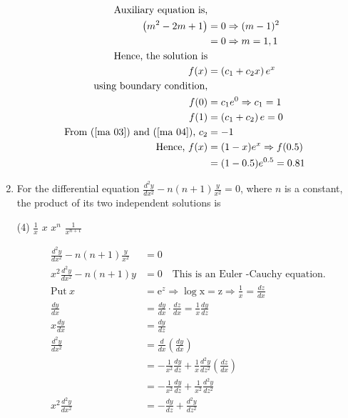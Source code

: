 \begin{enumerate}[label=\color{ocre}\textbf{\arabic*.}]
\begin{answer}
\begin{align}
		\text{Auxiliary equation is,}\notag\\
		\left(m^{2}-2 m+1\right)&=0 \Rightarrow(m-1)^{2}\notag\\&=0 \Rightarrow m=1,1\notag\\
		\text{Hence, the solution is}\notag\\
		f(x)&=\left(c_{1}+c_{2} x\right) e^{x}\notag\\
		\text{using boundary condition,}\notag\\
		f(0)&=c_{1} e^{0} \Rightarrow c_{1}=1 \label{ma 03}\\
		f(1)&=\left(c_{1}+c_{2}\right) e=0 \label{ma 04}\\
		\text{	From (\ref{ma 03}) and (\ref{ma 04}), }c_{2}&=-1 \label{ma 05}\notag\\
		\text{Hence, }f(x)&=(1-x) e^{x} \Rightarrow f(0.5)\notag\\&=(1-0.5) e^{0.5}=0.81\notag
		\end{align}
	\end{answer}
	\item  For the differential equation $\frac{d^{2} y}{d x^{2}}-n(n+1) \frac{y}{x^{2}}=0$, where $n$ is a constant, the product of
	its two independent solutions is
	{}
	\begin{tasks}(4)
		\task[\textbf{A.}] $\frac{1}{x}$
		\task[\textbf{B.}] $x$
		\task[\textbf{C.}] $x^{n}$
		\task[\textbf{D.}] $\frac{1}{x^{n+1}}$
	\end{tasks}
	\begin{answer}
		\begin{align*}
		\frac{d^{2} y}{d x^{2}}-n(n+1) \frac{y}{x^{2}}&=0\\
		x^{2}\frac{d^{2} y}{d x^{2}}-n(n+1) y&=0 \quad \text{This is an Euler -Cauchy equation.}\\
		\text{Put} \ {x}&=\mathrm{e}^{z} \Rightarrow \log \mathrm{x}=\mathrm{z} \Rightarrow \frac{1}{x}=\frac{d z}{d x}\\
		\frac{d y}{d x}&=\frac{d y}{d x} \cdot \frac{d z}{d x}=\frac{1}{x} \frac{d y}{d z} \\ 
		{x} \frac{d y}{d x}&=\frac{d y}{d z}\\
		\frac{d^{2} y}{d x^{2}}&=\frac{d}{d x}\left(\frac{d y}{d x}\right)\\&=-\frac{1}{x^{2}} \frac{d y}{d z}+\frac{1}{x} \frac{d^{2} y}{d z^{2}}\left(\frac{d z}{d x}\right)\\&=-\frac{1}{x^{2}} \frac{d y}{d z}+\frac{1}{x^{2}} \frac{d^{2} y}{d z^{2}} \\ x^{2} \frac{d^{2} y}{d x^{2}}&=-\frac{d y}{d z}+\frac{d^{2} y}{d z^{2}}

\end{align*}
\end{answer}
\end{enumerate}
